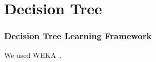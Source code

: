 \section{Decision Tree}
\begin{frame}
\frametitle{Decision Tree Learning Framework}

We used WEKA~\citep*{weka}.

\end{frame}
